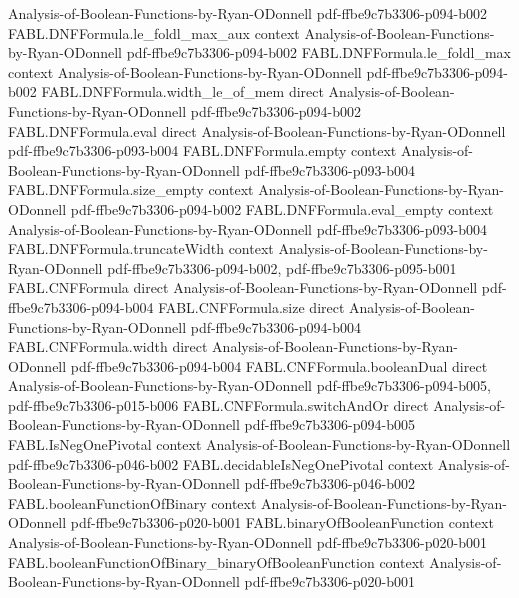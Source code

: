 \begin{theorem}
  {Analysis-of-Boolean-Functions-by-Ryan-ODonnell}
  {pdf-ffbe9c7b3306-p094-b002}
\proofstep
  {FABL.DNFFormula.le_foldl_max_aux}
  {context}
  {Analysis-of-Boolean-Functions-by-Ryan-ODonnell}
  {pdf-ffbe9c7b3306-p094-b002}
\proofstep
  {FABL.DNFFormula.le_foldl_max}
  {context}
  {Analysis-of-Boolean-Functions-by-Ryan-ODonnell}
  {pdf-ffbe9c7b3306-p094-b002}
\proofstep
  {FABL.DNFFormula.width_le_of_mem}
  {direct}
  {Analysis-of-Boolean-Functions-by-Ryan-ODonnell}
  {pdf-ffbe9c7b3306-p094-b002}
\proofstep
  {FABL.DNFFormula.eval}
  {direct}
  {Analysis-of-Boolean-Functions-by-Ryan-ODonnell}
  {pdf-ffbe9c7b3306-p093-b004}
\proofstep
  {FABL.DNFFormula.empty}
  {context}
  {Analysis-of-Boolean-Functions-by-Ryan-ODonnell}
  {pdf-ffbe9c7b3306-p093-b004}
\proofstep
  {FABL.DNFFormula.size_empty}
  {context}
  {Analysis-of-Boolean-Functions-by-Ryan-ODonnell}
  {pdf-ffbe9c7b3306-p094-b002}
\proofstep
  {FABL.DNFFormula.eval_empty}
  {context}
  {Analysis-of-Boolean-Functions-by-Ryan-ODonnell}
  {pdf-ffbe9c7b3306-p093-b004}
\proofstep
  {FABL.DNFFormula.truncateWidth}
  {context}
  {Analysis-of-Boolean-Functions-by-Ryan-ODonnell}
  {pdf-ffbe9c7b3306-p094-b002,
    pdf-ffbe9c7b3306-p095-b001}
\proofstep
  {FABL.CNFFormula}
  {direct}
  {Analysis-of-Boolean-Functions-by-Ryan-ODonnell}
  {pdf-ffbe9c7b3306-p094-b004}
\proofstep
  {FABL.CNFFormula.size}
  {direct}
  {Analysis-of-Boolean-Functions-by-Ryan-ODonnell}
  {pdf-ffbe9c7b3306-p094-b004}
\proofstep
  {FABL.CNFFormula.width}
  {direct}
  {Analysis-of-Boolean-Functions-by-Ryan-ODonnell}
  {pdf-ffbe9c7b3306-p094-b004}
\proofstep
  {FABL.CNFFormula.booleanDual}
  {direct}
  {Analysis-of-Boolean-Functions-by-Ryan-ODonnell}
  {pdf-ffbe9c7b3306-p094-b005,
    pdf-ffbe9c7b3306-p015-b006}
\proofstep
  {FABL.CNFFormula.switchAndOr}
  {direct}
  {Analysis-of-Boolean-Functions-by-Ryan-ODonnell}
  {pdf-ffbe9c7b3306-p094-b005}
\proofstep
  {FABL.IsNegOnePivotal}
  {context}
  {Analysis-of-Boolean-Functions-by-Ryan-ODonnell}
  {pdf-ffbe9c7b3306-p046-b002}
\proofstep
  {FABL.decidableIsNegOnePivotal}
  {context}
  {Analysis-of-Boolean-Functions-by-Ryan-ODonnell}
  {pdf-ffbe9c7b3306-p046-b002}
\proofstep
  {FABL.booleanFunctionOfBinary}
  {context}
  {Analysis-of-Boolean-Functions-by-Ryan-ODonnell}
  {pdf-ffbe9c7b3306-p020-b001}
\proofstep
  {FABL.binaryOfBooleanFunction}
  {context}
  {Analysis-of-Boolean-Functions-by-Ryan-ODonnell}
  {pdf-ffbe9c7b3306-p020-b001}
\proofstep
  {FABL.booleanFunctionOfBinary_binaryOfBooleanFunction}
  {context}
  {Analysis-of-Boolean-Functions-by-Ryan-ODonnell}
  {pdf-ffbe9c7b3306-p020-b001}
\proofstep

\end{theorem}
